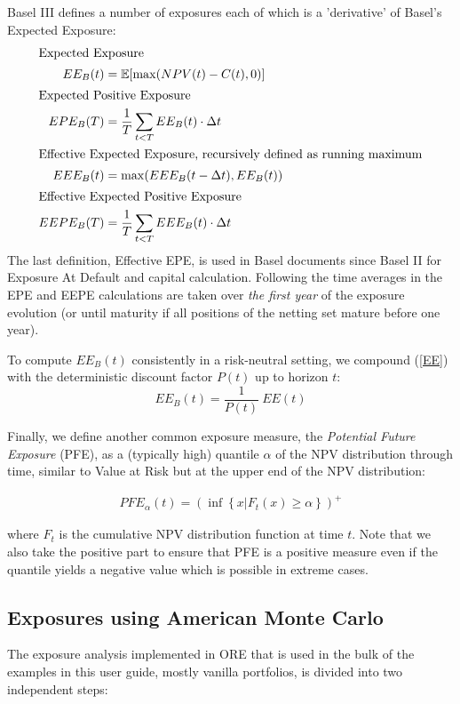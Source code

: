 \documentclass[12pt, a4paper]{article}
\newcommand\E{\ensuremath{\mathbb{E}}}
\newcommand{\PFE}{\mathit{PFE}}
\newcommand{\EE}{\mathit{EE}}
\begin{document}
{\begin{appendix}
\medskip
Basel III defines a number of exposures each of which is a 'derivative' of Basel's Expected Exposure:
\begin{align}
\intertext{Expected Exposure}
EE_B(t) &= \E[\max(NPV(t) - C(t), 0)] \label{basel_ee}\\
\intertext{Expected Positive Exposure}
EPE_B(T) &= \frac{1}{T} \sum_{t<T} EE_B(t)\cdot \Delta t  \label{basel_epe} \\
\intertext{Effective Expected Exposure, recursively defined as running maximum}
EEE_B(t) &= \max(EEE_B(t-\Delta t), EE_B(t)) \label{basel_eee}\\
\intertext{Effective Expected Positive Exposure}
EEPE_B(T) &= \frac{1}{T} \sum_{t<T} EEE_B(t)\cdot \Delta t \label{basel_eepe}
\end{align}
The last definition, Effective EPE, is used in Basel documents since Basel II for Exposure At Default and capital
calculation. Following \cite{bcbs128,bcbs189} the time averages in the EPE and EEPE calculations are taken over {\em the
  first year} of the exposure evolution (or until maturity if all positions of the netting set mature before one year).

\medskip
To compute $EE_B(t)$ consistently in a risk-neutral setting, we compound (\ref{EE}) with the deterministic discount factor $P(t)$ up to horizon $t$:
$$
EE_B(t) = \frac{1}{P(t)} \:\EE(t)
$$

Finally, we define another common exposure measure, the {\em Potential Future Exposure} (PFE), as a (typically high)
quantile $\alpha$ of the NPV distribution through time, similar to Value at Risk but at the upper end of the NPV
distribution:

\begin{align}
  \PFE_\alpha(t) = \left(\inf\left\{ x | F_t(x) \geq \alpha\right\}\right)^+ \label{PFE}
\end{align}

where $F_t$ is the cumulative NPV distribution function at time $t$. Note that we also take the positive part to ensure
that PFE is a positive measure even if the quantile yields a negative value which is possible in extreme cases.
 
\subsection{Exposures using American Monte Carlo}
\label{sec:app_amc}

The exposure analysis implemented in ORE that is used in the bulk of the examples in this user guide, mostly vanilla portfolios, 
is divided into two independent steps:


\end{appendix}}
\end{document}
